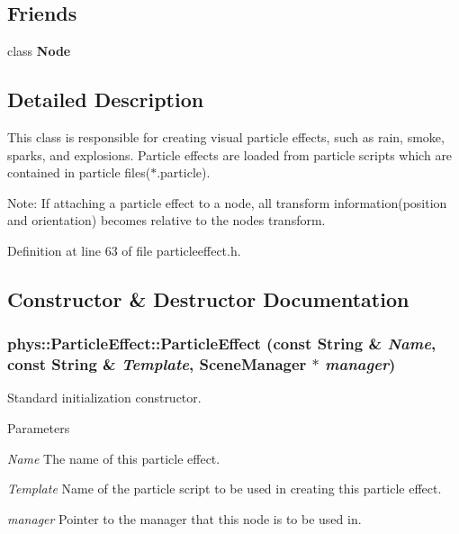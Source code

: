 \subsection*{Friends}
\begin{DoxyCompactItemize}
\item 
\hypertarget{classphys_1_1ParticleEffect_a6db9d28bd448a131448276ee03de1e6d}{
class {\bfseries Node}}
\label{d2/d69/classphys_1_1ParticleEffect_a6db9d28bd448a131448276ee03de1e6d}

\end{DoxyCompactItemize}


\subsection{Detailed Description}
This class is responsible for creating visual particle effects, such as rain, smoke, sparks, and explosions. Particle effects are loaded from particle scripts which are contained in particle files($\ast$.particle). \par
 Note: If attaching a particle effect to a node, all transform information(position and orientation) becomes relative to the nodes transform. 

Definition at line 63 of file particleeffect.h.



\subsection{Constructor \& Destructor Documentation}
\hypertarget{classphys_1_1ParticleEffect_a42d17b7cd81968603c70920c30e6f812}{
\subsubsection[{ParticleEffect}]{\setlength{\rightskip}{0pt plus 5cm}phys::ParticleEffect::ParticleEffect (const {\bf String} \& {\em Name}, \/  const {\bf String} \& {\em Template}, \/  {\bf SceneManager} $\ast$ {\em manager})}}
\label{d2/d69/classphys_1_1ParticleEffect_a42d17b7cd81968603c70920c30e6f812}


Standard initialization constructor. 


\begin{DoxyParams}{Parameters}
\item[{\em Name}]The name of this particle effect. \item[{\em Template}]Name of the particle script to be used in creating this particle effect. \item[{\em manager}]Pointer to the manager that this node is to be used in. \end{DoxyParams}


